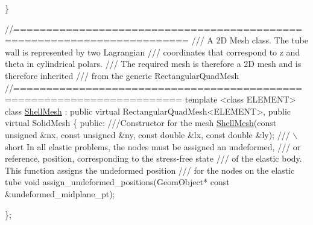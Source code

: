 \begin{DoxyCodeInclude}
\}

\textcolor{comment}{//======================================================================== }\textcolor{comment}{}
\textcolor{comment}{/// A 2D Mesh class. The tube wall is represented by two Lagrangian }
\textcolor{comment}{/// coordinates that correspond to z and theta in cylindrical polars. }
\textcolor{comment}{/// The required mesh is therefore a  2D mesh and is therefore inherited }
\textcolor{comment}{/// from the generic RectangularQuadMesh }
\textcolor{comment}{}\textcolor{comment}{//=======================================================================}
\textcolor{keyword}{template} <\textcolor{keyword}{class} ELEMENT>
\textcolor{keyword}{class }\hyperlink{classShellMesh}{ShellMesh} : \textcolor{keyword}{public} \textcolor{keyword}{virtual} RectangularQuadMesh<ELEMENT>,
                  \textcolor{keyword}{public} \textcolor{keyword}{virtual} SolidMesh
\{
\textcolor{keyword}{public}:
 \textcolor{comment}{}
\textcolor{comment}{ ///Constructor for the mesh}
\textcolor{comment}{} \hyperlink{classShellMesh}{ShellMesh}(\textcolor{keyword}{const} \textcolor{keywordtype}{unsigned} &nx, \textcolor{keyword}{const} \textcolor{keywordtype}{unsigned} &ny, 
           \textcolor{keyword}{const} \textcolor{keywordtype}{double} &lx, \textcolor{keyword}{const} \textcolor{keywordtype}{double} &ly);
 \textcolor{comment}{}
\textcolor{comment}{ /// \(\backslash\)short In all elastic problems, the nodes must be assigned an undeformed,}
\textcolor{comment}{ /// or reference, position, corresponding to the stress-free state}
\textcolor{comment}{ /// of the elastic body. This function assigns the undeformed position }
\textcolor{comment}{ /// for the nodes on the elastic tube}
\textcolor{comment}{} \textcolor{keywordtype}{void} assign\_undeformed\_positions(GeomObject* \textcolor{keyword}{const} &undeformed\_midplane\_pt);

\};






\end{DoxyCodeInclude}
